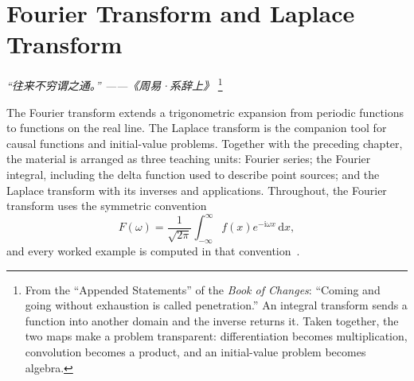 \chapter{Fourier Transform and Laplace Transform}
\renewcommand{\currentchapterpath}{chapters/ft/}

\begin{flushright}
\textit{“往来不穷谓之通。” ——《周易·系辞上》}
\footnote{From the ``Appended Statements'' of the \textit{Book of Changes}: ``Coming and going without exhaustion is called penetration.'' An integral transform sends a function into another domain and the inverse returns it. Taken together, the two maps make a problem transparent: differentiation becomes multiplication, convolution becomes a product, and an initial-value problem becomes algebra.}
\end{flushright}

The Fourier transform extends a trigonometric expansion from periodic functions to functions on the real line. The Laplace transform is the companion tool for causal functions and initial-value problems. Together with the preceding chapter, the material is arranged as three teaching units: Fourier series; the Fourier integral, including the delta function used to describe point sources; and the Laplace transform with its inverses and applications. Throughout, the Fourier transform uses the symmetric convention
\begin{equation*}
F(\omega)=\frac{1}{\sqrt{2\pi}}\int_{-\infty}^{\infty}f(x)e^{-\mathrm{i}\omega x}\,\mathrm{d}x,
\end{equation*}
and every worked example is computed in that convention~\cite{bracewell,lighthill}.

